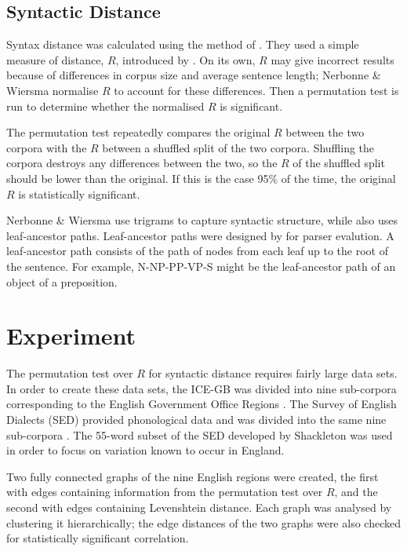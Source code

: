 \documentclass[11pt,letterpaper]{article}
\begin{document}
\subsection{Syntactic Distance}
Syntax distance was calculated using the method of
. They used a simple measure of distance,
$R$, introduced by . On its own, $R$ may give
incorrect results because of differences in corpus size and average
sentence length; Nerbonne \& Wiersma normalise $R$ to account for
these differences. Then a permutation test is run to determine whether the
normalised $R$ is significant.

The permutation test repeatedly compares the original $R$ between the
two corpora with the $R$ between a shuffled split of the two
corpora. Shuffling the corpora destroys any differences between the
two, so the $R$ of the shuffled split should be lower than the
original. If this is the case 95\% of the time, the original $R$ is
statistically significant.

Nerbonne \& Wiersma use trigrams to capture syntactic structure, while
 also uses leaf-ancestor
paths. Leaf-ancestor paths were designed by
 for parser evalution. A leaf-ancestor path
consists of the path of nodes from each leaf up to the root of the
sentence. For example,
N-NP-PP-VP-S might be the leaf-ancestor path of an object of a preposition.

\section{Experiment}

The permutation test over $R$ for syntactic distance requires fairly
large data sets. In order to create these data sets, the ICE-GB was
divided into nine sub-corpora corresponding to the English Government
Office Regions \cite{nelson02}. The Survey of English Dialects (SED)
provided phonological data and was divided into the same nine
sub-corpora \cite{orton63}. The 55-word subset of the SED developed by
Shackleton was used in order to focus on variation known to occur in
England.

Two fully connected graphs of the nine English regions were created,
the first with edges containing information
from the permutation test over $R$, and the second with edges containing
Levenshtein distance. Each graph was analysed by clustering it
hierarchically; the edge distances of the two graphs were also
checked for statistically significant correlation.
\end{document}
